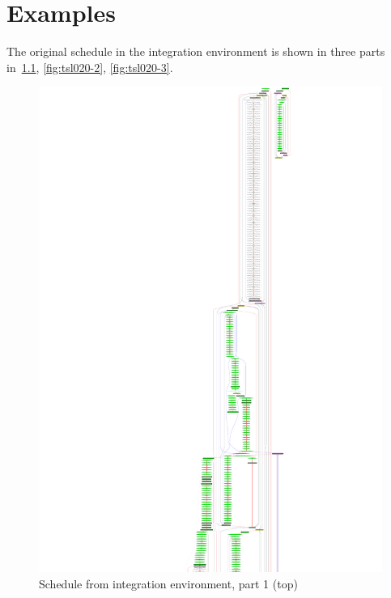 \documentclass[12pt,a4paper]{report}
\begin{document}
\chapter{Examples}
The original schedule in the integration environment is shown in three parts in~\ref{fig:tsl020-1},
\ref{fig:tsl020-2}, \ref{fig:tsl020-3}.
    \begin{figure}
        \centering
        \includegraphics*[width=1.0\textwidth,keepaspectratio]{tsl020-1.pdf}
        \caption{Schedule from integration environment, part 1 (top)}
        \label{fig:tsl020-1}
    \end{figure}
\end{document}

